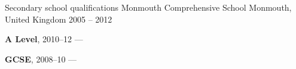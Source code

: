 \begin{cventries}
    \cventry
        {Secondary school qualifications}
        {Monmouth Comprehensive School}
        {Monmouth, United Kingdom}
        {2005 -- 2012}
        {
        \begin{cvitems}
            \item {\textbf{A Level}, 2010--12 --- }
            \vpaddingEduNorm
            \item {\textbf{GCSE}, 2008--10 --- }
        \end{cvitems}
        }
\end{cventries}
